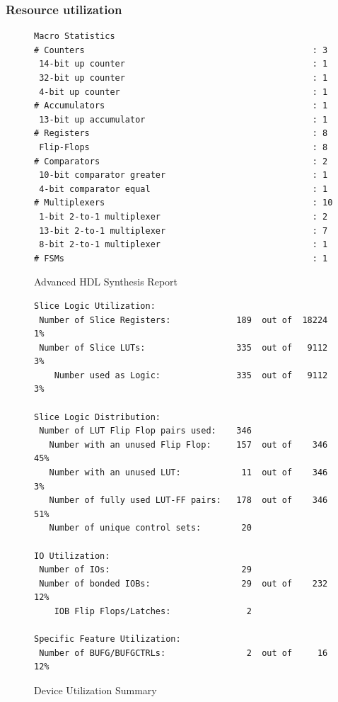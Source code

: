 \documentclass{article}
\begin{document}
	    \subsubsection{Resource utilization}
			\begin{figure}[H]  
				\caption{Advanced HDL Synthesis Report}
	   			\begin{lstlisting}
Macro Statistics
# Counters                                             : 3
 14-bit up counter                                     : 1
 32-bit up counter                                     : 1
 4-bit up counter                                      : 1
# Accumulators                                         : 1
 13-bit up accumulator                                 : 1
# Registers                                            : 8
 Flip-Flops                                            : 8
# Comparators                                          : 2
 10-bit comparator greater                             : 1
 4-bit comparator equal                                : 1
# Multiplexers                                         : 10
 1-bit 2-to-1 multiplexer                              : 2
 13-bit 2-to-1 multiplexer                             : 7
 8-bit 2-to-1 multiplexer                              : 1
# FSMs                                                 : 1
	   			\end{lstlisting}
	   		\end{figure}

	   		\begin{figure}[H]  
	   			\caption{Device Utilization Summary}
	   			\begin{lstlisting}
Slice Logic Utilization: 
 Number of Slice Registers:             189  out of  18224     1%  
 Number of Slice LUTs:                  335  out of   9112     3%  
    Number used as Logic:               335  out of   9112     3%  

Slice Logic Distribution: 
 Number of LUT Flip Flop pairs used:    346
   Number with an unused Flip Flop:     157  out of    346    45%  
   Number with an unused LUT:            11  out of    346     3%  
   Number of fully used LUT-FF pairs:   178  out of    346    51%  
   Number of unique control sets:        20

IO Utilization: 
 Number of IOs:                          29
 Number of bonded IOBs:                  29  out of    232    12%  
    IOB Flip Flops/Latches:               2

Specific Feature Utilization:
 Number of BUFG/BUFGCTRLs:                2  out of     16    12%  
	   			\end{lstlisting}
	   		\end{figure}
\end{document}
